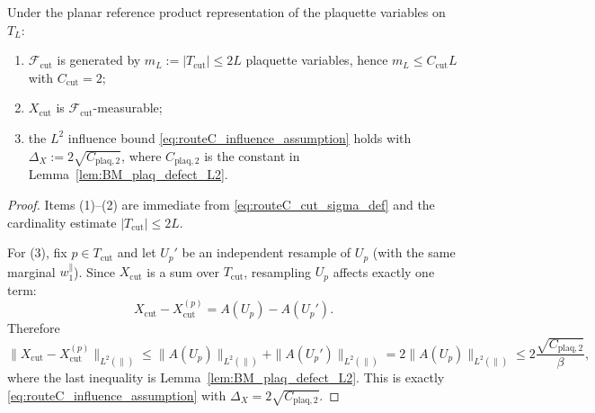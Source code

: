\begin{lemma}\label{lem:routeC_cut_instantiation}
Under the planar reference product representation of the plaquette variables on $T_L$:
\begin{enumerate}
\item $\mathcal F_{\mathrm{cut}}$ is generated by $m_L:=|T_{\mathrm{cut}}|\le 2L$ plaquette variables, hence $m_L\le C_{\mathrm{cut}}L$ with $C_{\mathrm{cut}}=2$;
\item $X_{\mathrm{cut}}$ is $\mathcal F_{\mathrm{cut}}$-measurable;
\item the $L^2$ influence bound \eqref{eq:routeC_influence_assumption} holds with $\Delta_X:=2\sqrt{C_{\mathrm{plaq},2}}$, where $C_{\mathrm{plaq},2}$ is the constant in Lemma~\ref{lem:BM_plaq_defect_L2}.
\end{enumerate}
\end{lemma}
\begin{proof}
Items (1)--(2) are immediate from \eqref{eq:routeC_cut_sigma_def} and the cardinality estimate $|T_{\mathrm{cut}}|\le 2L$.

For (3), fix $p\in T_{\mathrm{cut}}$ and let $U_p'$ be an independent resample of $U_p$ (with the same marginal $w_1^{\parallel}$).
Since $X_{\mathrm{cut}}$ is a sum over $T_{\mathrm{cut}}$, resampling $U_p$ affects exactly one term:
\[
X_{\mathrm{cut}}-X_{\mathrm{cut}}^{(p)} = A(U_p)-A(U_p').
\]
Therefore
\[
\|X_{\mathrm{cut}}-X_{\mathrm{cut}}^{(p)}\|_{L^2(\parallel)}
\le \|A(U_p)\|_{L^2(\parallel)}+\|A(U_p')\|_{L^2(\parallel)}
=2\|A(U_p)\|_{L^2(\parallel)}
\le 2\frac{\sqrt{C_{\mathrm{plaq},2}}}{\beta},
\]
where the last inequality is Lemma~\ref{lem:BM_plaq_defect_L2}.
This is exactly \eqref{eq:routeC_influence_assumption} with $\Delta_X=2\sqrt{C_{\mathrm{plaq},2}}$.
\end{proof}

